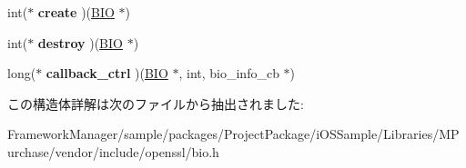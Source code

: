 \begin{DoxyCompactItemize}
\item 
\hypertarget{structbio__method__st_a79d9b2836d02d86c8aaf859093e5a3f5}{}int($\ast$ {\bfseries create} )(\hyperlink{structbio__st}{B\+I\+O} $\ast$)\label{structbio__method__st_a79d9b2836d02d86c8aaf859093e5a3f5}

\item 
\hypertarget{structbio__method__st_a082d42c342cf11044b9a634ae96a4c94}{}int($\ast$ {\bfseries destroy} )(\hyperlink{structbio__st}{B\+I\+O} $\ast$)\label{structbio__method__st_a082d42c342cf11044b9a634ae96a4c94}

\item 
\hypertarget{structbio__method__st_a6b1b0a905468bba2ee191ae0401a65a3}{}long($\ast$ {\bfseries callback\+\_\+ctrl} )(\hyperlink{structbio__st}{B\+I\+O} $\ast$, int, bio\+\_\+info\+\_\+cb $\ast$)\label{structbio__method__st_a6b1b0a905468bba2ee191ae0401a65a3}

\end{DoxyCompactItemize}


この構造体詳解は次のファイルから抽出されました\+:\begin{DoxyCompactItemize}
\item 
Framework\+Manager/sample/packages/\+Project\+Package/i\+O\+S\+Sample/\+Libraries/\+M\+Purchase/vendor/include/openssl/bio.\+h\end{DoxyCompactItemize}
